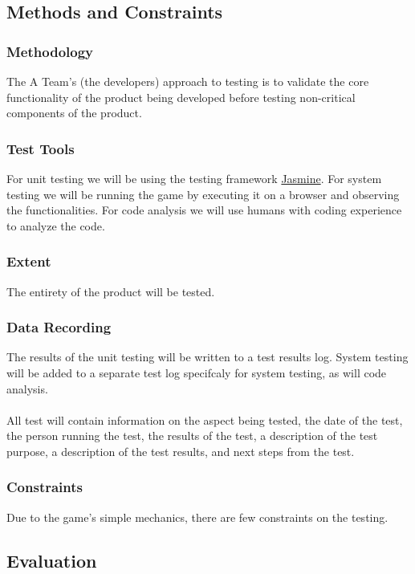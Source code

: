 \documentclass[11pt, oneside]{article}   	%
\begin{document}
\subsection{Methods and Constraints}
\subsubsection*{Methodology}
The A Team's (the developers) approach to testing is to validate the core functionality of the product being developed before testing non-critical components of the product.

\subsubsection*{Test Tools}
For unit testing we will be using the testing framework \href{http://jasmine.github.io/}{Jasmine}. For system testing we will be running the game by executing it on a browser and observing the functionalities. For code analysis we will use humans with coding experience to analyze the code.

\subsubsection*{Extent}
The entirety of the product will be tested.

\subsubsection*{Data Recording}
The results of the unit testing will be written to a test results log. System testing will be added to a separate test log specifcaly for system testing, as will code analysis.\\
\\
All test will contain information on the aspect being tested, the date of the test, the person running the test, the results of the test, a description of the test purpose, a description of the test results, and next steps from the test.

\subsubsection*{Constraints}
Due to the game's simple mechanics, there are few constraints on the testing.

\subsection{Evaluation}
\end{document}
